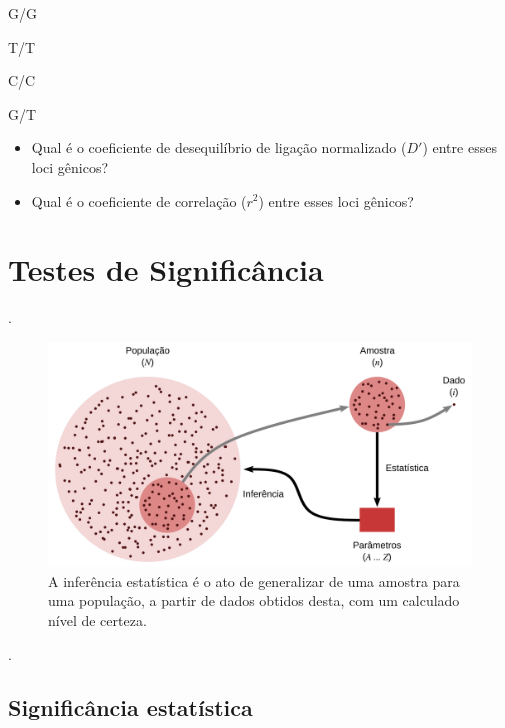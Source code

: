 \documentclass[
]{book}
\begin{document}
G/G

T/T

C/C

G/T

\begin{itemize}
\item
  Qual é o coeficiente de desequilíbrio de ligação normalizado (\(D'\)) entre esses loci gênicos?
\item
  Qual é o coeficiente de correlação (\(r^2\)) entre esses loci gênicos?
\end{itemize}

\hypertarget{testes-de-significuxe2ncia}{%
\chapter{Testes de Significância}\label{testes-de-significuxe2ncia}}

.\linebreak

\begin{figure}

{\centering \includegraphics[width=600px]{figs/inferencia_estatistica} 

}

\caption{A inferência estatística é o ato de generalizar de uma amostra para uma população, a partir de dados obtidos desta, com um calculado nível de certeza.}\label{fig:infestat}
\end{figure}

.\linebreak

\hypertarget{significuxe2ncia-estatuxedstica}{%
\section{Significância estatística}\label{significuxe2ncia-estatuxedstica}}
\end{document}
